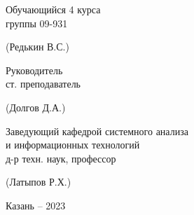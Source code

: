 \begin{titlepage}
	\begin{center}
		
		\begin{minipage}{\textwidth}
			\begin{minipage}{0.40\textwidth}
				\begin{singlespace}
					Обучающийся 4 курса \\
					группы 09-931
				\end{singlespace}
			\end{minipage}
			\begin{minipage}{0.60\textwidth}
				\hfill (Редькин В.С.)
			\end{minipage}
		\end{minipage}
	
		\vspace{0.5cm}

		\begin{minipage}{\textwidth}
			\begin{minipage}{0.40\textwidth}
				\begin{singlespace}
				Руководитель \\
				ст. преподаватель
				\end{singlespace}
			\end{minipage}
			\begin{minipage}{0.60\textwidth}
				\hfill (Долгов Д.А.)
			\end{minipage}
		\end{minipage}
	
		\vspace{0.5cm}
		
		\begin{minipage}{\textwidth}
			\begin{minipage}{0.60\textwidth}
				\raggedright
				\begin{singlespace}
					Заведующий кафедрой системного анализа \\
					и информационных технологий \\
					д-р техн. наук, профессор
				\end{singlespace}
			\end{minipage}
			\begin{minipage}{0.40\textwidth}
				\hfill (Латыпов Р.Х.)
			\end{minipage}
		\end{minipage}
		
		
		
	\end{center}
	
	
	\vfill
	
	\begin{center}
		Казань -- 2023
	\end{center}
	
	
\end{titlepage}
\thispagestyle{empty} %
\setcounter{page}{2} %